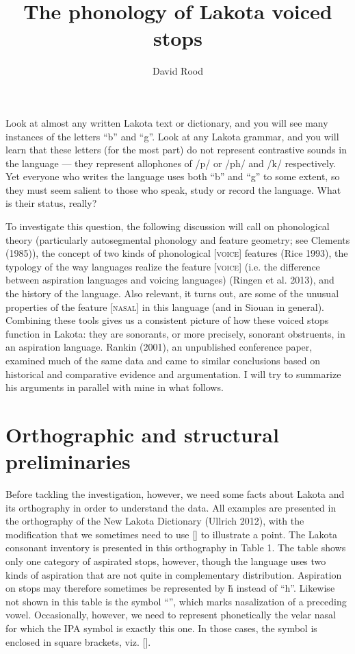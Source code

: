 \documentclass[output=paper]{LSP/langsci}
\author{David Rood}
\title{The phonology of Lakota voiced stops}
\begin{document}
Look at almost any written Lakota text or dictionary, and you will see many instances of the letters ``b'' and ``g''. Look at any Lakota grammar, and you will learn that these letters (for the most part) do not represent contrastive sounds in the language --- they represent allophones of /p/ or /ph/ and /k/ respectively. Yet everyone who writes the language uses both ``b'' and ``g'' to some extent, so they must seem salient to those who speak, study or record the language. What is their status, really?

To investigate this question, the following discussion will call on phonological theory (particularly autosegmental phonology and feature geometry; see Clements (1985)), the concept of two kinds of phonological [\textsc{voice}] features (Rice 1993), the typology of the way languages realize the feature [\textsc{voice}] (i.e. the difference between aspiration languages and voicing languages) (Ringen et al. 2013), and the history of the language. Also relevant, it turns out, are some of the unusual properties of the feature [\textsc{nasal}] in this language (and in Siouan in general). Combining these tools gives us a consistent picture of how these voiced stops function in Lakota: they are sonorants, or more precisely, sonorant obstruents, in an aspiration language. Rankin (2001), an unpublished conference paper, examined much of the same data and came to similar conclusions based on historical and comparative evidence and argumentation. I will try to summarize his arguments in parallel with mine in what follows.

\section{Orthographic and structural preliminaries}

Before tackling the investigation, however, we need some facts about Lakota and its orthography in order to understand the data. All examples are presented in the orthography of the New Lakota Dictionary (Ullrich 2012), with the modification that we sometimes need to use [] to illustrate a point. The Lakota consonant inventory is presented in this orthography in Table 1. The table shows only one category of aspirated stops, however, though the language uses two kinds of aspiration that are not quite in complementary distribution. Aspiration on stops may therefore sometimes be represented by \v{h} instead of ``h''. Likewise not shown in this table is the symbol ``'', which marks nasalization of a preceding vowel. Occasionally, however, we need to represent phonetically the velar nasal for which the IPA symbol is exactly this one. In those cases, the symbol is enclosed in square brackets, viz. [].
\end{document}

